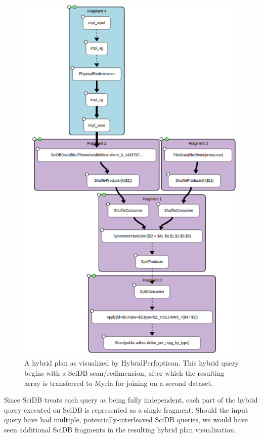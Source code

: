 \documentclass{chi2009}
\begin{document}
\begin{figure}[h]
\begin{center}
\includegraphics[scale=0.4]{visualization-example.png}
\end{center}
\caption{A hybrid plan as visualized by HybridPerfopticon.  This hybrid query begins with a SciDB scan/redimension, after which the resulting array is transferred to Myria for joining on a second dataset.}
\label{fig:hybrid-visualization}
\end{figure}

Since SciDB treats each query as being fully independent, each part of the hybrid query  executed on SciDB is represented as a single fragment. Should the input query have had multiple, potentially-interleaved SciDB queries, we would have seen additional SciDB fragments in the resulting hybrid plan visualization. 
\end{document}
